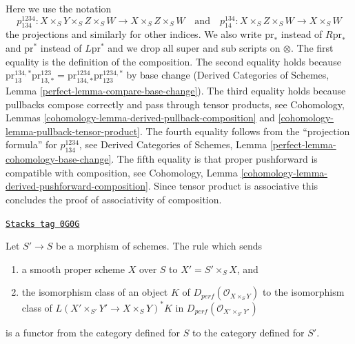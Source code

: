 Here we use the notation
$$
p^{1234}_{134} : X \times_S Y \times_S Z \times_S W
\to X \times_S Z \times_S W
\quad\text{and}\quad
p^{134}_{14} : X \times_S Z \times_S W \to X \times_S W
$$
the projections and similarly for other indices.
We also write $\text{pr}_*$ instead of $R\text{pr}_*$ and
$\text{pr}^*$ instead of $L\text{pr}^*$ and we drop
all super and sub scripts on $\otimes$.
The first equality is the definition of the composition.
The second equality holds because
$\text{pr}^{134, *}_{13} \text{pr}^{123}_{13, *} =
\text{pr}^{1234}_{134, *} \text{pr}^{1234, *}_{123}$
by base change (Derived Categories of Schemes, Lemma
\ref{perfect-lemma-compare-base-change}).
The third equality holds because pullbacks compose
correctly and pass through tensor products, see
Cohomology, Lemmas \ref{cohomology-lemma-derived-pullback-composition} and
\ref{cohomology-lemma-pullback-tensor-product}.
The fourth equality follows from the ``projection formula'' for
$p^{1234}_{134}$, see Derived Categories of Schemes, Lemma
\ref{perfect-lemma-cohomology-base-change}.
The fifth equality is that proper pushforward is compatible
with composition, see
Cohomology, Lemma \ref{cohomology-lemma-derived-pushforward-composition}.
Since tensor product is associative
this concludes the proof of associativity of composition.

\begin{lemma}
\label{equiv-lemma-base-change-is-functor}
\href{https://stacks.math.columbia.edu/tag/0G0G}{\texttt{Stacks tag 0G0G}}

Let $S' \to S$ be a morphism of schemes.
The rule which sends
\begin{enumerate}
\item a smooth proper scheme $X$ over $S$ to $X' =  S' \times_S X$, and
\item the isomorphism class of an object $K$
of $D_{perf}(\mathcal{O}_{X \times_S Y})$ to the isomorphism class of
$L(X' \times_{S'} Y' \to X \times_S Y)^*K$
in $D_{perf}(\mathcal{O}_{X' \times_{S'} Y'})$
\end{enumerate}
is a functor from the category defined for $S$ to the category
defined for $S'$.
\end{lemma}

